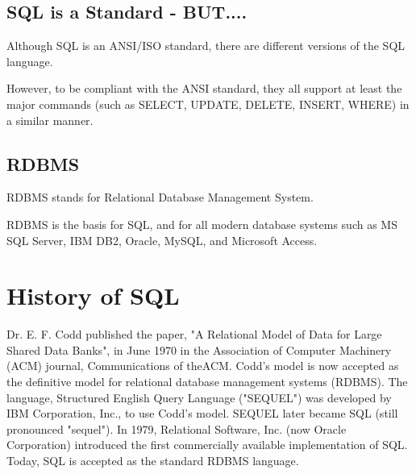 \documentclass{article}
\begin{document}
\subsection{SQL is a Standard - BUT....}

Although SQL is an ANSI/ISO standard, there are different versions of the SQL language.

However, to be compliant with the ANSI standard, they all support at least the major commands (such as SELECT, UPDATE, DELETE, INSERT, WHERE) in a similar manner.

\subsection{RDBMS}
RDBMS stands for Relational Database Management System.

RDBMS is the basis for SQL, and for all modern database systems such as MS SQL Server, IBM DB2, Oracle, MySQL, and Microsoft Access.


\section{History of SQL}

Dr. E. F. Codd published the paper, "A Relational Model of Data for Large Shared Data Banks", in
June 1970 in the Association of Computer Machinery (ACM) journal, Communications of theACM.
Codd's model is now accepted as the definitive model for relational database management systems
(RDBMS). The language, Structured English Query Language ("SEQUEL") was developed by IBM
Corporation, Inc., to use Codd's model. SEQUEL later became SQL (still pronounced "sequel"). In
1979, Relational Software, Inc. (now Oracle Corporation) introduced the first commercially available
implementation of SQL. Today, SQL is accepted as the standard RDBMS language.
\end{document}
